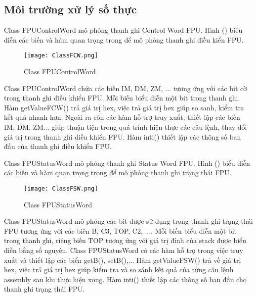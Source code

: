 	\newpage	
	\subsection*{Môi trường xử lý số thực}
	Class FPUControlWord mô phỏng thanh ghi Control Word FPU. Hình () biểu diễn các biến và hàm quan trọng trong để mô phỏng thanh ghi điều kiển FPU.	
		\begin{center}
			\begin{figure}[htp]
				\begin{center}
					\texttt{[image: ClassFCW.png]}
				\end{center}
				\caption{Class FPUControlWord	}	
					\label{fig:ClassFlag}		
			\end{figure}
		\end{center}		
			
		Class FPUControlWord chứa các biến IM, DM, ZM, ... tương ứng với các bit cờ trong thanh ghi điều khiển FPU. Mỗi biến biểu diễn một bit trong thanh ghi. Hàm getValueFCW() trả giá trị hex, việc trả giá trị hex giúp so sanh, kiểm tra kết quả nhanh hơn. Ngoài ra còn các hàm hỗ trợ truy xuất, thiết lập các biến IM, DM, ZM... giúp thuận tiện trong quá trình hiện thực các câu lệnh, thay đổi giá trị trong thanh ghi điều khiển FPU. Hàm inti() thiết lập các thông số ban đầu của thanh ghi điều khiển FPU. 
		
		\newpage
		Class FPUStatusWord mô phỏng thanh ghi Status Word FPU. Hình () biểu diễn các biến và hàm quan trọng trong để mô phỏng thanh ghi trạng thái FPU.	
	\begin{center}
			\begin{figure}[htp]
				\begin{center}
					\texttt{[image: ClassFSW.png]}
				\end{center}
				\caption{Class FPUStatusWord	}	
					\label{fig:ClassFlag}		
			\end{figure}
		\end{center}			
		
		Class FPUStatusWord mô phỏng các bit được sử dụng trong thanh ghi trạng thái FPU tương ứng với các biên B, C3, TOP, C2, .... Mỗi biến biểu diễn một bit trong thanh ghi, riêng biến TOP tương ứng với giá trị đỉnh của stack được biểu diễn bằng số nguyên. Class FPUStatusWord có các hàm hỗ trợ trong việc truy xuất và thiết lập các biển getB(), setB(),... Hàm getValueFSW() trả về giá trị hex, việc trả giá trị hex giúp kiểm tra và so sánh kết quả của từng câu lệnh assembly sau khi thực hiện xong. Hàm inti() thiết lập các thông số ban đầu cho thanh ghi trạng thái FPU.
		
